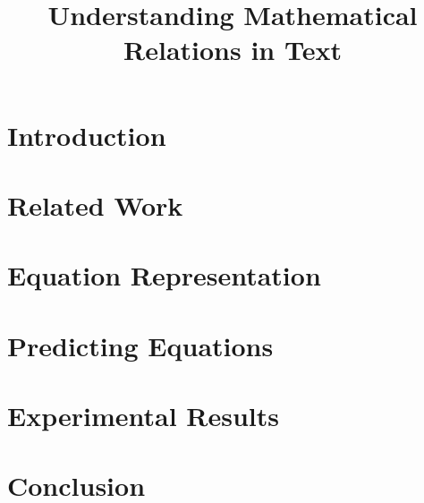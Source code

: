 
\title{Understanding Mathematical Relations in Text}


\date{}


\maketitle
\begin{abstract}

\end{abstract}

\section{Introduction}


\section{Related Work}


\section{Equation Representation}


\section{Predicting Equations}


\section{Experimental Results}


\section{Conclusion}






